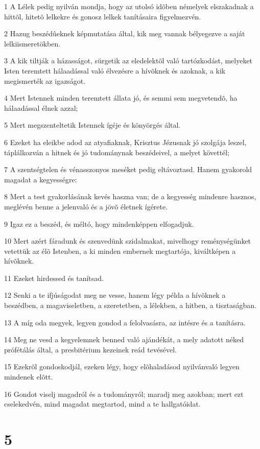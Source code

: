 \par 1 A Lélek pedig nyilván mondja, hogy az utolsó idõben némelyek elszakadnak a hittõl, hitetõ lelkekre és gonosz lelkek tanításaira figyelmezvén.
\par 2 Hazug beszédûeknek képmutatása által, kik meg vannak bélyegezve a saját lelkiismeretökben.
\par 3 A kik tiltják a házasságot, sürgetik az eledelektõl való tartózkodást, melyeket Isten teremtett hálaadással való élvezésre a hívõknek és azoknak, a kik megismerték az igazságot.
\par 4 Mert Istennek minden teremtett állata jó, és semmi sem megvetendõ, ha hálaadással élnek azzal;
\par 5 Mert megszenteltetik Istennek ígéje és könyörgés által.
\par 6 Ezeket ha eleikbe adod az atyafiaknak, Krisztus Jézusnak jó szolgája leszel, táplálkozván a hitnek és jó tudománynak beszédeivel, a melyet követtél;
\par 7 A szentségtelen és vénasszonyos meséket pedig eltávoztasd. Hanem gyakorold magadat a kegyességre:
\par 8 Mert a test gyakorlásának kevés haszna van; de a kegyesség mindenre hasznos, meglévén benne a jelenvaló és a jövõ életnek ígérete.
\par 9 Igaz ez a beszéd, és méltó, hogy mindenképpen elfogadjuk.
\par 10 Mert azért fáradunk és szenvedünk szidalmakat, mivelhogy reménységünket vetettük az élõ Istenben, a ki minden embernek megtartója, kiváltképen a hívõknek.
\par 11 Ezeket hirdessed és tanítsad.
\par 12 Senki a te ifjúságodat meg ne vesse, hanem légy példa a hívõknek a beszédben, a magaviseletben, a szeretetben, a lélekben, a hitben, a tisztaságban.
\par 13 A míg oda megyek, legyen gondod a felolvasásra, az intésre és a tanításra.
\par 14 Meg ne vesd a kegyelemnek benned való ajándékát, a mely adatott néked prófétálás által, a presbitérium kezeinek reád tevésével.
\par 15 Ezekrõl gondoskodjál, ezeken légy, hogy elõhaladásod nyilvánvaló legyen mindenek elõtt.
\par 16 Gondot viselj magadról és a tudományról; maradj meg azokban; mert ezt cselekedvén, mind magadat megtartod, mind a te hallgatóidat.

\chapter{5}

